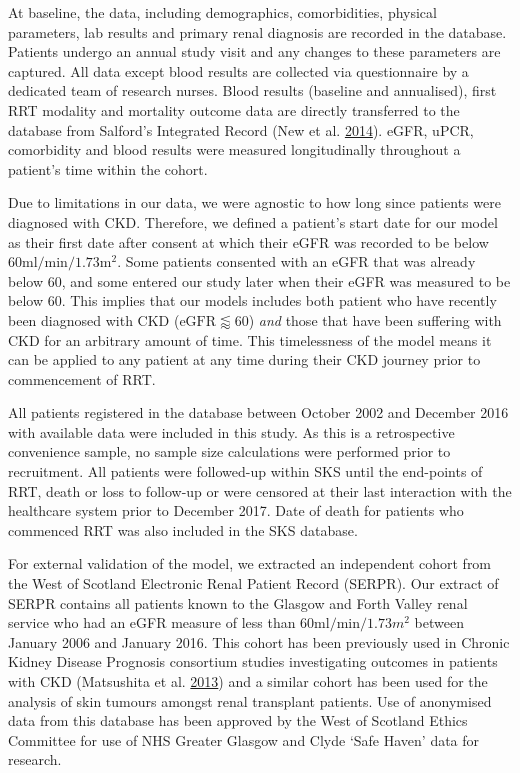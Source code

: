\documentclass[
]{article}
\begin{document}
At baseline, the data, including demographics, comorbidities, physical parameters, lab results and primary renal diagnosis are recorded in the database. Patients undergo an annual study visit and any changes to these parameters are captured. All data except blood results are collected via questionnaire by a dedicated team of research nurses. Blood results (baseline and annualised), first RRT modality and mortality outcome data are directly transferred to the database from Salford's Integrated Record (New et al. \protect\hyperlink{ref-new_obtaining_2014}{2014}). eGFR, uPCR, comorbidity and blood results were measured longitudinally throughout a patient's time within the cohort.

Due to limitations in our data, we were agnostic to how long since patients were diagnosed with CKD. Therefore, we defined a patient's start date for our model as their first date after consent at which their eGFR was recorded to be below \(60\textrm{ml}/\textrm{min}/1.73\textrm{m}^2\). Some patients consented with an eGFR that was already below 60, and some entered our study later when their eGFR was measured to be below 60. This implies that our models includes both patient who have recently been diagnosed with CKD (\(\textrm{eGFR} \lessapprox 60\)) \emph{and} those that have been suffering with CKD for an arbitrary amount of time. This timelessness of the model means it can be applied to any patient at any time during their CKD journey prior to commencement of RRT.

All patients registered in the database between October 2002 and December 2016 with available data were included in this study. As this is a retrospective convenience sample, no sample size calculations were performed prior to recruitment. All patients were followed-up within SKS until the end-points of RRT, death or loss to follow-up or were censored at their last interaction with the healthcare system prior to December 2017. Date of death for patients who commenced RRT was also included in the SKS database.

For external validation of the model, we extracted an independent cohort from the West of Scotland Electronic Renal Patient Record (SERPR). Our extract of SERPR contains all patients known to the Glasgow and Forth Valley renal service who had an eGFR measure of less than \(60\textrm{ml}/\textrm{min}/1.73m^2\) between January 2006 and January 2016. This cohort has been previously used in Chronic Kidney Disease Prognosis consortium studies investigating outcomes in patients with CKD (Matsushita et al. \protect\hyperlink{ref-matsushita_cohort_2013}{2013}) and a similar cohort has been used for the analysis of skin tumours amongst renal transplant patients. Use of anonymised data from this database has been approved by the West of Scotland Ethics Committee for use of NHS Greater Glasgow and Clyde `Safe Haven' data for research.
\end{document}
